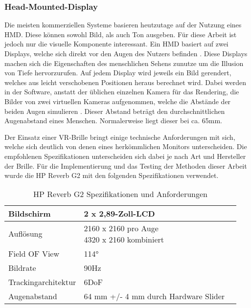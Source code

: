 \subsubsection{Head-Mounted-Display}
Die meisten kommerziellen Systeme basieren heutzutage auf der Nutzung eines HMD.
Diese können sowohl Bild, als auch Ton ausgeben. Für diese Arbeit ist jedoch nur die visuelle Komponente interessant.
Ein HMD basiert auf zwei Displays, welche sich direkt vor den Augen des Nutzers befinden \parencite{Sutherland1968}.
Diese Displays machen sich die Eigenschaften des menschlichen Sehens zunutze um die Illusion von Tiefe hervorzurufen.
Auf jedem Display wird jeweils ein Bild gerendert, welches aus leicht verschobenen Positionen heraus berechnet wird.
Dabei werden in der Software, anstatt der üblichen einzelnen Kamera für das Rendering, die Bilder von zwei virtuellen Kameras aufgenommen,
welche die Abstände der beiden Augen simulieren \parencite{NVIDIA2010}. Dieser Abstand beträgt den durchschnittlichen
Augenabstand eines Menschen. Normalerweise liegt dieser bei ca. 65mm.

Der Einsatz einer VR-Brille bringt einige technische Anforderungen mit sich, welche sich deutlich
von denen eines herkömmlichen Monitors unterscheiden. Die empfohlenen Spezifikationen unterscheiden sich dabei je nach Art und
Hersteller der Brille. Für die Implementierung und das Testing der Methoden dieser Arbeit wurde die HP Reverb G2 mit den folgenden
Spezifikationen verwendet.


\begin{table}[h]
	\renewcommand*{\arraystretch}{2}
	\setlength{\tabcolsep}{1.5cm}
	\begin{tabular}{lll}
		\hspace{-1.5cm}Bildschirm          & 2 x 2,89-Zoll-LCD                    \\ \hline
		\hspace{-1.5cm}Auflösung           & \makecell[l]{2160 x 2160 pro Auge    \\4320 x 2160 kombiniert}  \\ \hline
		\hspace{-1.5cm}Field OF View       & \raisebox{-0.6ex}{\~{ }}114°         \\ \hline
		\hspace{-1.5cm}Bildrate            & 90Hz                                 \\ \hline
		\hspace{-1.5cm}Trackingarchitektur & 6DoF                                 \\ \hline
		\hspace{-1.5cm}Augenabstand        & 64 mm +/- 4 mm durch Hardware Slider \\ \hline
	\end{tabular}
	\caption[Tabelle 1]{HP Reverb G2 Spezifikationen und Anforderungen \parencite{HPG2}}
\end{table}








